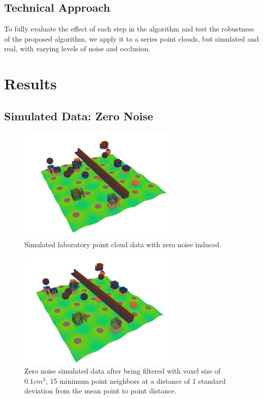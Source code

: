 \documentclass[12pt]{drexelthesis}
\let\Oldsection\section
\renewcommand{\section}{\FloatBarrier\Oldsection}
\begin{document}
\section{Technical Approach}
To fully evaluate the effect of each step in the algorithm and test the robustness of the proposed algorithm, we apply it to a series point clouds, but simulated and real, with varying levels of noise and occlusion.





\chapter{Results}
\label{chap:results}
\section{Simulated Data: Zero Noise}

\begin{figure}[!h]
	\label{zeronoise:raw}
		\centering
		\includegraphics[width=3in]{simulated-lab-scan/0noise/sim-lab-0noise.jpg}
		\caption[Simulated laboratory point cloud data with zero noise induced]{\centering Simulated laboratory point cloud data with zero noise induced.}
\end{figure}

\begin{figure}[!h]
	\label{zeronoise:filtered}
	\centering
		\includegraphics[width=3in]{simulated-lab-scan/0noise/sim-lab-0noise-DS01-k15std1.jpg}
		\caption[Zero noise simulated data after being filtered with voxel size of 0.1 $cm^{3}$, 15 minimum point neighbors at a distance of 1 standard deviation from the mean point to point distance]{\centering Zero noise simulated data after being filtered with voxel size of $0.1 cm^{3}$, 15 minimum point neighbors at a distance of 1 standard deviation from the mean point to point distance.}
\end{figure}
\end{document}
